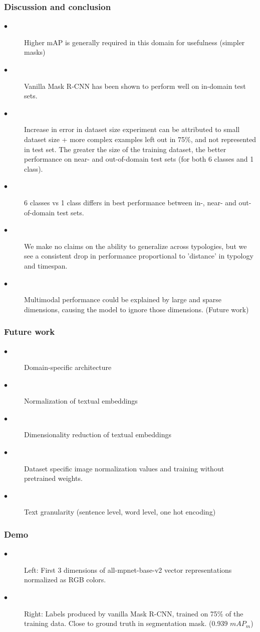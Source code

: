\documentclass[aspectratio=1610]{beamer}
\begin{document}
\begin{frame}
  \frametitle{Discussion and conclusion}
\begin{description}
\item[$\bullet$] Higher mAP is generally required in this domain for usefulness (simpler masks)
\item[$\bullet$] Vanilla Mask R-CNN has been shown to perform well on in-domain test sets.
\item[$\bullet$] Increase in error in dataset size experiment can be attributed to small dataset size + more complex examples left out in 75\%, and not represented in test set. The greater the size of the training dataset, the better performance on near- and out-of-domain test sets (for both 6 classes and 1 class).
\item[$\bullet$] 6 classes vs 1 class differs in best performance between in-, near- and out-of-domain test sets.
\item[$\bullet$] We make no claims on the ability to generalize across typologies, but we see a consistent drop in performance proportional to 'distance' in typology and timespan.
\item[$\bullet$] Multimodal performance could be explained by large and sparse dimensions, causing the model to ignore those dimensions. (Future work)
\end{description}

\end{frame}
\normalpage

\begin{frame}
  \frametitle{Future work}
\begin{description}
\item[$\bullet$] Domain-specific architecture
\item[$\bullet$] Normalization of textual embeddings
\item[$\bullet$] Dimensionality reduction of textual embeddings
\item[$\bullet$] Dataset specific image normalization values and training without pretrained weights.
\item[$\bullet$] Text granularity (sentence level, word level, one hot encoding)
\end{description}

\end{frame}
\normalpage

\begin{frame}
  \frametitle{Demo}
\begin{description}
\item[$\bullet$] Left: First 3 dimensions of all-mpnet-base-v2 vector representations normalized as RGB colors.
\item[$\bullet$] Right: Labels produced by vanilla Mask R-CNN, trained on 75\% of the training data. Close to ground truth in segmentation mask. (0.939 $mAP_{m}$)
\end{description}

\end{frame}
\normalpage
\end{document}
